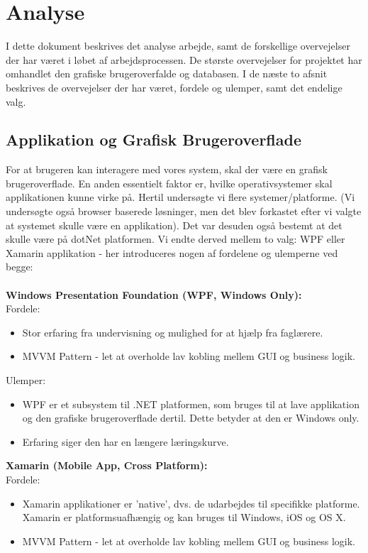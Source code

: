 \documentclass[a4paper,12pt,fleqn,oneside]{article}
\begin{document}

\tableofcontents
\newpage
\section{Analyse}
I dette dokument beskrives det analyse arbejde, samt de forskellige overvejelser der har været i løbet af arbejdsprocessen. De største overvejelser for projektet har omhandlet den grafiske brugeroverfalde og databasen. I de næste to afsnit beskrives de overvejelser der har været, fordele og ulemper, samt det endelige valg. 

\subsection{Applikation og Grafisk Brugeroverflade}
For at brugeren kan interagere med vores system, skal der være en grafisk brugeroverflade. En anden essentielt faktor er, hvilke operativsystemer skal applikationen kunne virke på. Hertil undersøgte vi flere systemer/platforme. (Vi undersøgte også browser baserede løsninger, men det blev forkastet efter vi valgte at systemet skulle være en applikation). Det var desuden også bestemt at det skulle være på dotNet platformen. Vi endte derved mellem to valg: WPF eller Xamarin applikation - her introduceres nogen af fordelene og ulemperne ved begge: \\\\
\textbf{Windows Presentation Foundation (WPF, Windows Only):} \\
Fordele:
\begin{itemize}
    \item Stor erfaring fra undervisning og mulighed for at hjælp fra faglærere. 
    \item MVVM Pattern - let at overholde lav kobling mellem GUI og business logik. 
\end{itemize}
Ulemper: 
\begin{itemize}
    \item WPF er et subsystem til .NET platformen, som bruges til at lave applikation og den grafiske brugeroverflade dertil. Dette betyder at den er Windows only. 
    \item Erfaring siger den har en længere læringskurve. 
\end{itemize}
\textbf{Xamarin (Mobile App, Cross Platform):} \\ 
Fordele:\\
\begin{itemize}
    \item Xamarin applikationer er 'native', dvs. de udarbejdes til specifikke platforme. Xamarin er platformsuafhængig og kan bruges til Windows, iOS og OS X. 
    \item MVVM Pattern - let at overholde lav kobling mellem GUI og business logik. 
\end{itemize}
\end{document}
